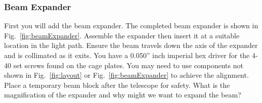 \documentclass[a4paper]{report}
\begin{document}
\clearpage

\subsubsection{Beam Expander}
First you will add the beam expander. 
The completed beam expander is shown in Fig.~\ref{fig:beamExpander}. 
Assemble the expander then insert it at a suitable location in the light path.
Ensure the beam travels down the axis of the expander and is collimated as it exits. 
You have a 0.050'' inch imperial hex driver for the 4-40 set screws found on the cage plates.
You may need to use components not shown in Fig.~\ref{fig:layout} or Fig.~\ref{fig:beamExpander} to achieve the alignment.
Place a temporary beam block after the telescope for safety.
What is the magnification of the expander and why might we want to expand the beam?
\end{document}
